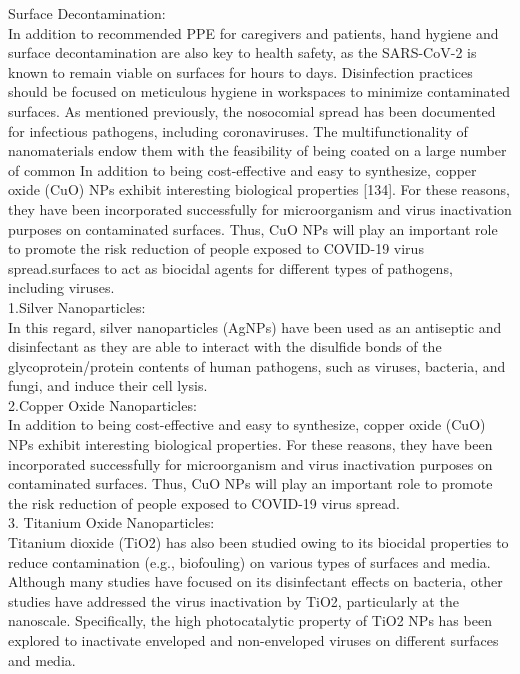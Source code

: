 \documentclass[12pt]{article}
\begin{document}
{\large Surface Decontamination:}
\\
In addition to recommended PPE for caregivers and patients, hand hygiene and surface decontamination are also key to health safety, as the SARS-CoV-2 is known to remain viable on surfaces for hours to days. Disinfection practices should be focused on meticulous hygiene in workspaces to minimize contaminated surfaces. As mentioned previously, the nosocomial spread has been documented for infectious pathogens, including coronaviruses. The multifunctionality of nanomaterials endow them with the feasibility of being coated on a large number of common In addition to being cost-effective and easy to synthesize, copper oxide (CuO) NPs exhibit interesting biological properties [134]. For these reasons, they have been incorporated successfully for microorganism and virus inactivation purposes on contaminated surfaces. Thus, CuO NPs will play an important role to promote the risk reduction of people exposed to COVID-19 virus spread.surfaces to act as biocidal agents for different types of pathogens, including viruses.
\\
1.Silver Nanoparticles:
\\
In this regard, silver nanoparticles (AgNPs) have been used as an antiseptic and disinfectant as they are able to interact with the disulfide bonds of the glycoprotein/protein contents of human pathogens, such as viruses, bacteria, and fungi, and induce their cell lysis.
\\
2.Copper Oxide Nanoparticles:
\\
In addition to being cost-effective and easy to synthesize, copper oxide (CuO) NPs exhibit interesting biological properties. For these reasons, they have been incorporated successfully for microorganism and virus inactivation purposes on contaminated surfaces. Thus, CuO NPs will play an important role to promote the risk reduction of people exposed to COVID-19 virus spread.
\\
3. Titanium Oxide Nanoparticles:
\\
Titanium dioxide (TiO2) has also been studied owing to its biocidal properties to reduce contamination (e.g., biofouling) on various types of surfaces and media. Although many studies have focused on its disinfectant effects on bacteria, other studies have addressed the virus inactivation by TiO2, particularly at the nanoscale. Specifically, the high photocatalytic property of TiO2 NPs has been explored to inactivate enveloped and non-enveloped viruses on different surfaces and media.
\\
\end{document}
